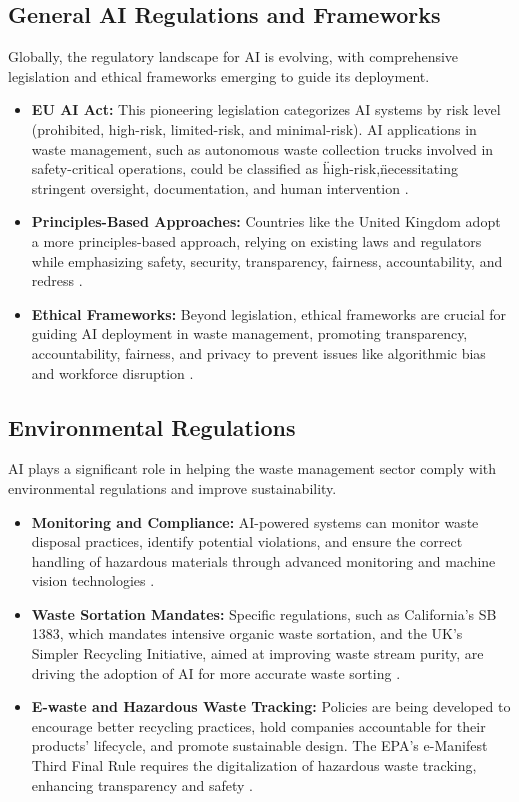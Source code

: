 \subsection{General AI Regulations and Frameworks}
Globally, the regulatory landscape for AI is evolving, with comprehensive legislation and ethical frameworks emerging to guide its deployment.
\begin{itemize}
    \item \textbf{EU AI Act:}
This pioneering legislation categorizes AI systems by risk level (prohibited, high-risk, limited-risk, and minimal-risk). AI applications in waste management, such as autonomous waste collection trucks involved in safety-critical operations, could be classified as \"high-risk,\" necessitating stringent oversight, documentation, and human intervention \cite{CircularOnline_Reg}.
    \item \textbf{Principles-Based Approaches:}
Countries like the United Kingdom adopt a more principles-based approach, relying on existing laws and regulators while emphasizing safety, security, transparency, fairness, accountability, and redress \cite{SustainabilityDirectory_Reg_1}.
    \item \textbf{Ethical Frameworks:}
Beyond legislation, ethical frameworks are crucial for guiding AI deployment in waste management, promoting transparency, accountability, fairness, and privacy to prevent issues like algorithmic bias and workforce disruption \cite{Medium_Reg}.
\end{itemize}

\subsection{Environmental Regulations}
AI plays a significant role in helping the waste management sector comply with environmental regulations and improve sustainability.
\begin{itemize}
    \item \textbf{Monitoring and Compliance:}
AI-powered systems can monitor waste disposal practices, identify potential violations, and ensure the correct handling of hazardous materials through advanced monitoring and machine vision technologies \cite{CleanTech_Reg}.
    \item \textbf{Waste Sortation Mandates:}
Specific regulations, such as California's SB 1383, which mandates intensive organic waste sortation, and the UK's Simpler Recycling Initiative, aimed at improving waste stream purity, are driving the adoption of AI for more accurate waste sorting \cite{SustainabilityDirectory_Reg_2}.
    \item \textbf{E-waste and Hazardous Waste Tracking:}
Policies are being developed to encourage better recycling practices, hold companies accountable for their products' lifecycle, and promote sustainable design. The EPA's e-Manifest Third Final Rule requires the digitalization of hazardous waste tracking, enhancing transparency and safety \cite{SustainabilityDirectory_Reg_3}.
\end{itemize}

